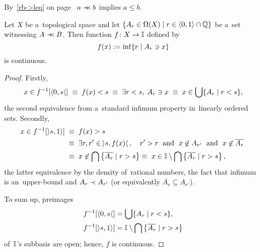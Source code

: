 \begin{rem}
  By~\ref{rb->leq} on page~\pageref{rb->leq} $a \prec\mkern-8mu\prec b$ implies $a \le b$.
\end{rem}

\begin{lem} \label{cb->continuous}
  Let $X$ be a~topological space and let $\{A_r\in \Omega(X) \mid r\in \langle
  0, 1 \rangle \cap \mathbb{Q}\}$ be a~set witnessing $A \prec\mkern-8mu\prec B$.
  Then function $f\colon X \to \mathbb{I}$ defined by
  \[
    f(x) := \inf \{r \mid A_r \owns x\}
  \]
  is continuous.
\end{lem}
\begin{proof}
  Firstly,
  \[
    x\in f^{-1}[\langle 0, s \langle] \; \equiv \;
    f(x) < s \; \equiv \;
    \exists r < s, \; A_r \owns x \; \equiv \;
    x\in \bigcup \{ A_r \mid r < s \},
  \]
  the second equivalence from a~standard infimum property in~linearly ordered
  sets. Secondly,
  \begin{align*}
    x\in f^{-1}[\rangle s, 1 \rangle] \; &\equiv \;
    f(x) > s \\
    &\equiv \; \exists r, r' \in \,\rangle s, f(x) \langle\,, \quad  r' > r
    \;\text{ and }\; x\not\in A_{r'} \;\text{ and }\; x\not\in \overline{A_r}
    \; \\
    &\equiv \; x\not\in \bigcap \left\{ \overline{A_r} \mid r > s \right\}
    \equiv \; x\in \mathbb{I}\setminus \bigcap \left\{ \overline{A_r} \mid r > s
    \right\},
  \end{align*}
  the latter equivalence by the density of~rational numbers, the fact that
  infimum is an~upper-bound and $A_r \prec A_{r'}$ (or equivalently
  $\overline{A_r}\subseteq A_{r'}$).

  To sum up, preimages
  \begin{align*}
    f^{-1}[\langle 0, s \langle] &= \bigcup \{ A_r \mid r < s \}, \\
    f^{-1}[\rangle s, 1 \rangle] &= \mathbb{I}\setminus \bigcap \left\{ \overline{A_r} \mid r > s \right\}
  \end{align*}
  of~$\mathbb{I}$'s subbasis are open;
  hence, $f$ is continuous.
\end{proof}

